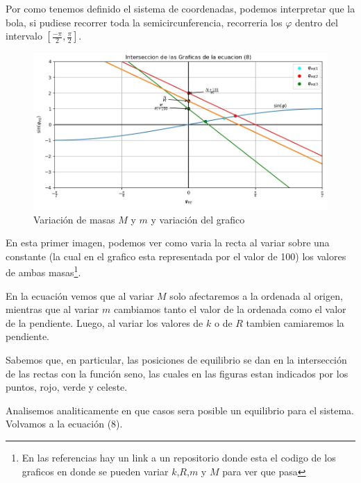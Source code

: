 \documentclass[10pt]{article}
\begin{document}
Por como tenemos definido el sistema de coordenadas, podemos interpretar que la bola, si pudiese recorrer toda la semicircunferencia, recorreria los $\varphi$ dentro del intervalo $[\frac{-\pi}{2}, \frac{\pi}{2}]$.

\begin{figure}[h]
	\centering
	\includegraphics[scale=0.7]{figuras/graf1.jpg}
	\caption{Variación de masas $M$ y $m$ y variación del grafico}
\end{figure}
En esta primer imagen, podemos ver como varia la recta al variar sobre una constante (la cual en el grafico esta representada por el valor de 100) los valores de ambas masas\footnote{En las referencias hay un link a un repositorio donde esta el codigo de los graficos en donde se pueden variar $k$,$R$,$m$ y $M$ para ver que pasa}.  

En la ecuación vemos que al variar $M$ solo afectaremos a la ordenada al origen, mientras que al variar $m$ cambiamos tanto el valor de la ordenada como el valor de la pendiente. Luego, al variar los valores de $k$ o de $R$ tambien camiaremos la pendiente.

Sabemos que, en particular, las posiciones de equilibrio se dan en la intersección de las rectas con la función seno, las cuales en las figuras estan indicados por los puntos, rojo, verde y celeste.

Analisemos analiticamente en que casos sera posible un equilibrio para el sistema. Volvamos a la ecuación (8).
\end{document}
